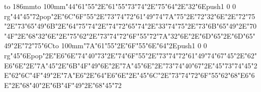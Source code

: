 \hbox to 186mm{\hsize=81mm\vbox to 100mm{\vfill\ipa\char"44\ipa\char"61\ipa\char"55\ipa\char"2E\ipa\char"61\ipa\char"55\ipa\char"73\ipa\char"74\ipa\char"2E\ipa\char"75\ipa\char"64\ipa\char"2E\ipa\char"32\ipa\char"6E\medskip\pdfcolorstack\match push{1 0 0 rg}\ipa\char"44\ipa\char"45\ipa\char"72\pdfcolorstack\match pop{}\ipa\char"2E\ipa\char"6C\ipa\char"6F\ipa\char"55\ipa\char"2E\ipa\char"73\ipa\char"74\ipa\char"72\ipa\char"61\ipa\char"49\ipa\char"74\medskip\ipa\char"7A\ipa\char"75\ipa\char"2E\ipa\char"72\ipa\char"32\ipa\char"6E\ipa\char"2E\ipa\char"72\ipa\char"75\ipa\char"2E\ipa\char"73\ipa\char"65\ipa\char"49\ipa\char"6B\ipa\char"2E\ipa\char"64\ipa\char"75\ipa\char"74\ipa\char"2E\ipa\char"74\ipa\char"72\ipa\char"65\ipa\char"74\ipa\char"2E\ipa\char"33\ipa\char"74\medskip\ipa\char"75\ipa\char"2E\ipa\char"73\ipa\char"6B\ipa\char"65\ipa\char"49\ipa\char"2E\ipa\char"70\ipa\char"4F\ipa\char"2E\ipa\char"68\ipa\char"32\ipa\char"6E\ipa\char"2E\ipa\char"75\ipa\char"62\ipa\char"2E\ipa\char"73\ipa\char"74\ipa\char"72\ipa\char"6F\ipa\char"55\ipa\char"72\medskip\ipa\char"7A\ipa\char"32\ipa\char"6E\ipa\char"2E\ipa\char"6D\ipa\char"65\ipa\char"2E\ipa\char"6D\ipa\char"65\ipa\char"49\ipa\char"2E\ipa\char"72\ipa\char"75\ipa\char"6C\vfill}\hfill\vbox to 100mm{\vfill\ipa\char"7A\ipa\char"61\ipa\char"55\ipa\char"2E\ipa\char"6F\ipa\char"55\ipa\char"6E\ipa\char"64\ipa\char"2E\pdfcolorstack\match push{1 0 0 rg}\ipa\char"45\ipa\char"6E\pdfcolorstack\match pop{}\ipa\char"2E\ipa\char"E6\ipa\char"6E\medskip\ipa\char"74\ipa\char"40\ipa\char"73\ipa\char"2E\ipa\char"74\ipa\char"6F\ipa\char"55\ipa\char"2E\ipa\char"73\ipa\char"74\ipa\char"72\ipa\char"61\ipa\char"49\ipa\char"74\medskip\ipa\char"67\ipa\char"45\ipa\char"2E\ipa\char"62\ipa\char"E6\ipa\char"6E\ipa\char"2E\ipa\char"7A\ipa\char"45\ipa\char"2E\ipa\char"6B\ipa\char"4F\ipa\char"49\ipa\char"6E\ipa\char"2E\ipa\char"7A\ipa\char"45\ipa\char"6E\ipa\char"2E\ipa\char"73\ipa\char"74\ipa\char"40\ipa\char"67\ipa\char"2E\ipa\char"45\ipa\char"73\ipa\char"74\medskip\ipa\char"45\ipa\char"2E\ipa\char"62\ipa\char"6C\ipa\char"4F\ipa\char"49\ipa\char"2E\ipa\char"7A\ipa\char"E6\ipa\char"2E\ipa\char"64\ipa\char"E6\ipa\char"6E\ipa\char"2E\ipa\char"45\ipa\char"6C\ipa\char"2E\ipa\char"73\ipa\char"74\ipa\char"72\ipa\char"6F\ipa\char"55\ipa\char"62\medskip\ipa\char"68\ipa\char"E6\ipa\char"6E\ipa\char"2E\ipa\char"68\ipa\char"40\ipa\char"2E\ipa\char"6B\ipa\char"4F\ipa\char"49\ipa\char"2E\ipa\char"68\ipa\char"45\ipa\char"72\vfill}}\eject
